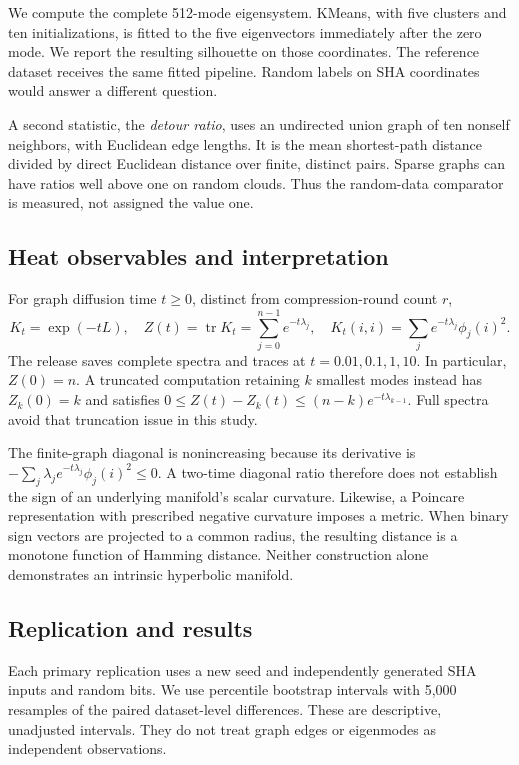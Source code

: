 \documentclass[11pt]{article}
\begin{document}
We compute the complete 512-mode eigensystem. KMeans, with five clusters and ten initializations, is fitted to the five eigenvectors immediately after the zero mode. We report the resulting silhouette on those coordinates. The reference dataset receives the same fitted pipeline. Random labels on SHA coordinates would answer a different question.

A second statistic, the \emph{detour ratio}, uses an undirected union graph of ten nonself neighbors, with Euclidean edge lengths. It is the mean shortest-path distance divided by direct Euclidean distance over finite, distinct pairs. Sparse graphs can have ratios well above one on random clouds. Thus the random-data comparator is measured, not assigned the value one.

\subsection{Heat observables and interpretation}
For graph diffusion time $t\geq0$, distinct from compression-round count $r$,
\begin{equation}
 K_t=\exp(-tL),\quad Z(t)=\operatorname{tr}K_t=\sum_{j=0}^{n-1}e^{-t\lambda_j},\quad
 K_t(i,i)=\sum_j e^{-t\lambda_j}\phi_j(i)^2.
\end{equation}
The release saves complete spectra and traces at $t=0.01,0.1,1,10$. In particular, $Z(0)=n$. A truncated computation retaining $k$ smallest modes instead has $Z_k(0)=k$ and satisfies $0\leq Z(t)-Z_k(t)\leq(n-k)e^{-t\lambda_{k-1}}$. Full spectra avoid that truncation issue in this study.

The finite-graph diagonal is nonincreasing because its derivative is $-\sum_j\lambda_j e^{-t\lambda_j}\phi_j(i)^2\leq0$. A two-time diagonal ratio therefore does not establish the sign of an underlying manifold's scalar curvature. Likewise, a Poincare representation with prescribed negative curvature imposes a metric. When binary sign vectors are projected to a common radius, the resulting distance is a monotone function of Hamming distance. Neither construction alone demonstrates an intrinsic hyperbolic manifold.

\subsection{Replication and results}
Each primary replication uses a new seed and independently generated SHA inputs and random bits. We use percentile bootstrap intervals with 5,000 resamples of the paired dataset-level differences. These are descriptive, unadjusted intervals. They do not treat graph edges or eigenmodes as independent observations.
\end{document}
